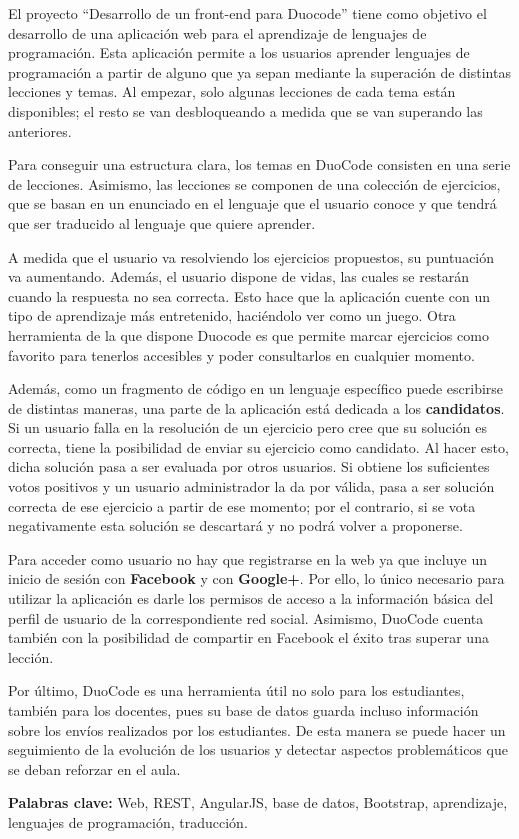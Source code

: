 
El proyecto ``Desarrollo de un front-end para Duocode'' tiene como objetivo el desarrollo de una aplicación web para el aprendizaje de lenguajes de programación. Esta aplicación permite a los usuarios aprender lenguajes de programación a partir de alguno que ya sepan mediante la superación de distintas lecciones y temas. Al empezar, solo algunas lecciones de cada tema están disponibles; el resto se van desbloqueando a medida que se van superando las anteriores.

Para conseguir una estructura clara, los temas en DuoCode consisten en una serie de lecciones. Asimismo, las lecciones se componen de una colección de ejercicios, que se basan en un enunciado en el lenguaje que el usuario conoce y que tendrá que ser traducido al lenguaje que quiere aprender.

A medida que el usuario va resolviendo los ejercicios propuestos, su puntuación va aumentando. Además, el usuario dispone de vidas, las cuales se restarán cuando la respuesta no sea correcta. Esto hace que la aplicación cuente con un tipo de aprendizaje más entretenido, haciéndolo ver como un juego. Otra herramienta de la que dispone Duocode es que permite marcar ejercicios como favorito para tenerlos accesibles y poder consultarlos en cualquier momento.

Además, como un fragmento de código en un lenguaje específico puede escribirse de distintas maneras, una parte de la aplicación está dedicada a los \textbf{candidatos}. Si un usuario falla en la resolución de un ejercicio pero cree que su solución es correcta, tiene la posibilidad de enviar su ejercicio como candidato. Al hacer esto, dicha solución pasa a ser evaluada por otros usuarios. Si obtiene los suficientes votos positivos y un usuario administrador la da por válida, pasa a ser solución correcta de ese ejercicio a partir de ese momento; por el contrario, si se vota negativamente esta solución se descartará y no podrá volver a proponerse.

Para acceder como usuario no hay que registrarse en la web ya que incluye un inicio de sesión con \textbf{Facebook} y con \textbf{Google+}. Por ello, lo único necesario para utilizar la aplicación es
darle los permisos de acceso a la información básica del perfil de usuario de la correspondiente red social. Asimismo, DuoCode cuenta también con la posibilidad de compartir en Facebook el éxito tras superar una lección.

Por último, DuoCode es una herramienta útil no solo para los estudiantes, también para los docentes, pues su base de datos guarda incluso información sobre los envíos realizados por los estudiantes. De esta manera se puede hacer un seguimiento de la evolución de los usuarios y detectar aspectos problemáticos que se deban reforzar en el aula.

\textbf{Palabras clave:} Web, REST, AngularJS, base de datos, Bootstrap, aprendizaje, lenguajes de programación, traducción.